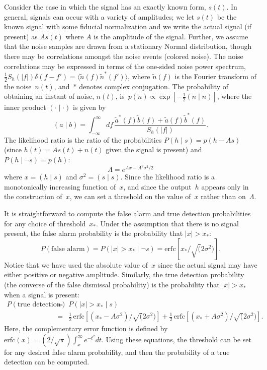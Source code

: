 Consider the case in which the signal has an exactly known form, $s(t)$.  In
general, signals can occur with a variety of amplitudes; we let $s(t)$ be the
known signal with some fiducial normalization and we write the actual signal
(if present) as $As(t)$ where $A$ is the amplitude of the signal.  Further, we
assume that the noise samples are drawn from a stationary Normal distribution,
though there may be correlations amongst the noise events (colored noise).
The noise correlations may be expressed in terms of the one-sided noise
power spectrum,
$\frac{1}{2}S_h(|f|)\delta(f-f')=\langle\tilde{n}(f)\tilde{n}^\ast(f')\rangle$,
where $\tilde{n}(f)$ is the Fourier transform of the noise~$n(t)$, and~$\ast$
denotes complex conjugation.  The probability of obtaining an instant of
noise, $n(t)$, is~$p(n)\propto\exp[-\frac{1}{2}(n\mid n)]$, where the inner
product $(\cdot\mid\cdot)$ is given by
\begin{equation}
  (a\mid b) = \int_{-\infty}^\infty df\,
  \frac{\tilde{a}^\ast(f)\tilde{b}(f)+\tilde{a}(f)\tilde{b}^\ast(f)}
       {S_h(|f|)}.
\end{equation}
The likelihood ratio is the ratio of the probabilities
$P(h\mid s)=p(h-As)$ (since $h(t)=As(t)+n(t)$ given the signal is present)
and~$P(h\mid\neg s)=p(h)$:
\begin{equation}
  \Lambda = e^{Ax-A^2\sigma^2/2}
\end{equation}
where $x=(h\mid s)$ and $\sigma^2=(s\mid s)$.  Since the likelihood ratio is
a monotonically increasing function of~$x$, and since the output~$h$ appears
only in the construction of~$x$, we can set a threshold on the value of~$x$
rather than on~$\Lambda$.

It is straightforward to compute the false alarm and true detection
probabilities for any choice of threshold~$x_\ast$.
Under the assumption
that there is no signal present, the false alarm probability is the
probability that $|x|>x_\ast$:
\begin{equation}
  P(\mbox{false alarm}) = P(|x|>x_\ast\mid\neg s) =
    {\mathrm{erfc}}[x_\ast/\surd(2\sigma^2)].
\end{equation}
Notice that we have used the absolute value of~$x$ since the actual signal
may have either positive or negative amplitude.
Similarly, the true detection probability (the converse of the false dismissal
probability) is the probability that $|x|>x_\ast$ when a signal is present:
\begin{eqnarray}
  P(\mbox{true detection}) &=& P(|x|>x_\ast\mid s) \nonumber\\
  &=& {\textstyle\frac{1}{2}}\,
      {\mathrm{erfc}}[(x_\ast-A\sigma^2)/\surd(2\sigma^2)]
    + {\textstyle\frac{1}{2}}\,
      {\mathrm{erfc}}[(x_\ast+A\sigma^2)/\surd(2\sigma^2)].
\end{eqnarray}
Here, the complementary error function is defined
by ${\mathrm{erfc}}(x)=(2/\surd\pi)\int_x^\infty e^{-t^2}dt$.  Using these
equations, the threshold can be set for any desired false alarm probability,
and then the probability of a true detection can be computed.

